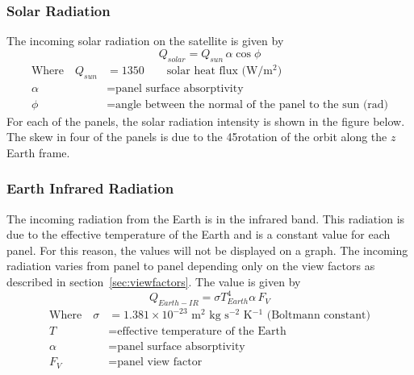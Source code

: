 \subsubsection{Solar Radiation}
The incoming solar radiation on the satellite is given by
\begin{equation}
    Q_{solar} = Q_{sun}\,\alpha\cos\phi
\end{equation}
\vspace{-1cm}
\begin{align}
\text{Where}\quad Q_{sun} &= 1350 \qquad \text{solar heat flux (W/m$^2$)} \nonumber\\
\alpha &= \text{panel surface absorptivity} \nonumber\\
\phi &= \text{angle between the normal of the panel to the sun (rad)} \nonumber
\end{align}
\noindent
For each of the panels, the solar radiation intensity is shown in the figure below. The skew in four of the panels is due to the 45\deg rotation of the orbit along the $z$ Earth frame.

\begin{figure}[H]
\end{figure}

\subsubsection{Earth Infrared Radiation}
The incoming radiation from the Earth is in the infrared band. This radiation is due to the effective temperature of the Earth and is a constant value for each panel. For this reason, the values will not be displayed on a graph. The incoming radiation varies from panel to panel depending only on the view factors as described in section~\ref{sec:viewfactors}. The value is given by
\begin{equation}
    Q_{Earth-IR} = \sigma T_{Earth}^4 \alpha \, F_V 
\end{equation}
\vspace{-1cm}
\begin{align}
\text{Where}\quad \sigma &= 1.381 \times 10^{-23}\text{ m$^2$ kg s$^{-2}$ K$^{-1}$ (Boltmann constant)} \nonumber\\
T &= \text{effective temperature of the Earth} \nonumber\\
\alpha &= \text{panel surface absorptivity} \nonumber\\
F_V &= \text{panel view factor} \nonumber
\end{align}

